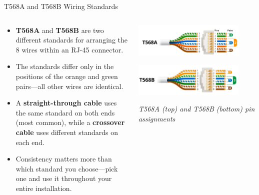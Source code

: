 \documentclass[aspectratio=169]{beamer}
\begin{document}
\begin{frame}{T568A and T568B Wiring Standards}
    \begin{columns}[T]
        \begin{column}{0.5\textwidth}
            \begin{itemize}
                \item \textbf{T568A} and \textbf{T568B} are two different standards for arranging the 8 wires within an RJ-45 connector.
                \item The standards differ only in the positions of the orange and green pairs---all other wires are identical.
                \item A \textbf{straight-through cable} uses the same standard on both ends (most common), while a \textbf{crossover cable} uses different standards on each end.
                \item Consistency matters more than which standard you choose---pick one and use it throughout your entire installation.
            \end{itemize}
        \end{column}
        \begin{column}{0.45\textwidth}
            \centering
            \includegraphics[width=0.85\textwidth]{T568A_pins.png}
            
            \vspace{0.3cm}
            \includegraphics[width=0.85\textwidth]{T565B_pins.png}
            
            \vspace{0.2cm}
            \small{\textit{T568A (top) and T568B (bottom) pin assignments}}
        \end{column}
    \end{columns}
\end{frame}
\end{document}
